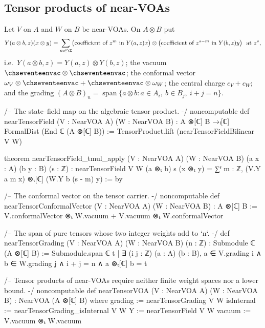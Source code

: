 \subsection{Tensor products of near-VOAs}

\begin{definition}\label{ch17:def:tensor}
Let $V$ on $A$ and $W$ on $B$ be near-VOAs.  On $A\otimes B$ put
\begin{equation}\label{ch17:eq:tensorfield}
  Y(a\otimes b,z)(x\otimes y)=\sum_{m\in\Z}\bigl(\text{coefficient of }z^m\text{ in }Y(a,z)x\bigr)\otimes
  \bigl(\text{coefficient of }z^{s-m}\text{ in }Y(b,z)y\bigr)\ \text{ at }z^s,
\end{equation}
i.e.\ $Y(a\otimes b,z)=Y(a,z)\otimes Y(b,z)$; the vacuum $\chseventeenvac\otimes\chseventeenvac$; the conformal vector
$\omega_V\otimes\chseventeenvac+\chseventeenvac\otimes\omega_W$; the central charge $c_V+c_W$; and the grading
$(A\otimes B)_n=\operatorname{span}\{a\otimes b:a\in A_i,\ b\in B_j,\ i+j=n\}$.
\end{definition}

\begin{leancode}
/-- The state–field map on the algebraic tensor product. -/
noncomputable def nearTensorField (V : NearVOA A) (W : NearVOA B) :
    A ⊗[ℂ] B →ₗ[ℂ] FormalDist (End ℂ (A ⊗[ℂ] B)) :=
  TensorProduct.lift (nearTensorFieldBilinear V W)

theorem nearTensorField_tmul_apply (V : NearVOA A) (W : NearVOA B)
    (a x : A) (b y : B) (s : ℤ) :
    nearTensorField V W (a ⊗ₜ b) s (x ⊗ₜ y) =
      ∑ᶠ m : ℤ, (V.Y a m x) ⊗ₜ[ℂ] (W.Y b (s - m) y) := by

/-- The conformal vector on the tensor carrier. -/
noncomputable def nearTensorConformalVector (V : NearVOA A) (W : NearVOA B) : A ⊗[ℂ] B :=
  V.conformalVector ⊗ₜ W.vacuum + V.vacuum ⊗ₜ W.conformalVector

/-- The span of pure tensors whose two integer weights add to `n`. -/
def nearTensorGrading (V : NearVOA A) (W : NearVOA B) (n : ℤ) :
    Submodule ℂ (A ⊗[ℂ] B) :=
  Submodule.span ℂ {t | ∃ (i j : ℤ) (a : A) (b : B),
    a ∈ V.grading i ∧ b ∈ W.grading j ∧ i + j = n ∧ a ⊗ₜ[ℂ] b = t}

/-- Tensor products of near-VOAs require neither finite weight spaces nor a lower bound. -/
noncomputable def nearTensorVOA (V : NearVOA A) (W : NearVOA B) : NearVOA (A ⊗[ℂ] B) where
  grading := nearTensorGrading V W
  isInternal := nearTensorGrading_isInternal V W
  Y := nearTensorField V W
  vacuum := V.vacuum ⊗ₜ W.vacuum
\end{leancode}

